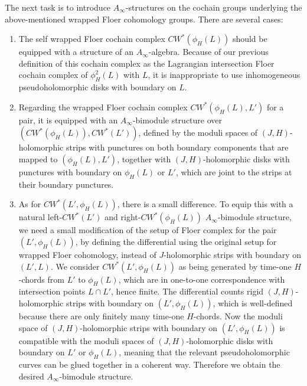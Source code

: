\documentclass{amsart}
\numberwithin{equation}{section}
\numberwithin{figure}{section}
\begin{document}
	The next task is to introduce $A_{\infty}$-structures on the cochain groups underlying the above-mentioned wrapped Floer cohomology groups. There are several cases:
\begin{enumerate}[label=(\roman*)]

\item The self wrapped Floer cochain complex $CW^{*}(\phi_{H}(L))$ should be equipped with a structure of an $A_{\infty}$-algebra. Because of our previous definition of this cochain complex as the Lagrangian intersection Floer cochain complex of $\phi_{H}^{2}(L)$ with $L$, it is inappropriate to use inhomogeneous pseudoholomorphic disks with boundary on $L$.

\item Regarding the wrapped Floer cochain complex $CW^{*}(\phi_{H}(L), L')$ for a pair, it is equipped with an $A_{\infty}$-bimodule structure over $(CW^{*}(\phi_{H}(L)), CW^{*}(L'))$, defined by the moduli spaces of $(J, H)$-holomorphic strips with punctures on both boundary components that are mapped to $(\phi_{H}(L), L')$, together with $(J, H)$-holomorphic disks with punctures with boundary on $\phi_{H}(L)$ or $L'$, which are joint to the strips at their boundary punctures.

\item As for $CW^{*}(L', \phi_{H}(L))$, there is a small difference. To equip this with a natural left-$CW^{*}(L')$ and right-$CW^{*}(\phi_{H}(L))$ $A_{\infty}$-bimodule structure, we need a small modification of the setup of Floer complex for the pair $(L', \phi_{H}(L))$, by defining the differential using the original setup for wrapped Floer cohomology, instead of $J$-holomorphic strips with boundary on $(L', L)$. We consider $CW^{*}(L', \phi_{H}(L))$ as being generated by time-one $H$-chords from $L'$ to $\phi_{H}(L)$, which are in one-to-one correspondence with intersection points $L \cap L'$, hence finite. The differential counts rigid $(J, H)$-holomorphic strips with boundary on $(L', \phi_{H}(L))$, which is well-defined because there are only finitely many time-one $H$-chords. Now the moduli space of $(J, H)$-holomorphic strips with boundary on $(L', \phi_{H}(L))$ is compatible with the moduli spaces of $(J, H)$-holomorphic disks with boundary on $L'$ or $\phi_{H}(L)$, meaning that the relevant pseudoholomorphic curves can be glued together in a coherent way. Therefore we obtain the desired $A_{\infty}$-bimodule structure.

\end{enumerate}
\end{document}
